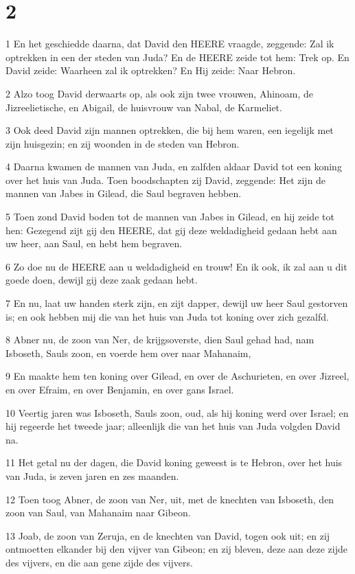 \chapter{2}

\par 1 En het geschiedde daarna, dat David den HEERE vraagde, zeggende: Zal ik optrekken in een der steden van Juda? En de HEERE zeide tot hem: Trek op. En David zeide: Waarheen zal ik optrekken? En Hij zeide: Naar Hebron.
\par 2 Alzo toog David derwaarts op, als ook zijn twee vrouwen, Ahinoam, de Jizreelietische, en Abigail, de huisvrouw van Nabal, de Karmeliet.
\par 3 Ook deed David zijn mannen optrekken, die bij hem waren, een iegelijk met zijn huisgezin; en zij woonden in de steden van Hebron.
\par 4 Daarna kwamen de mannen van Juda, en zalfden aldaar David tot een koning over het huis van Juda. Toen boodschapten zij David, zeggende: Het zijn de mannen van Jabes in Gilead, die Saul begraven hebben.
\par 5 Toen zond David boden tot de mannen van Jabes in Gilead, en hij zeide tot hen: Gezegend zijt gij den HEERE, dat gij deze weldadigheid gedaan hebt aan uw heer, aan Saul, en hebt hem begraven.
\par 6 Zo doe nu de HEERE aan u weldadigheid en trouw! En ik ook, ik zal aan u dit goede doen, dewijl gij deze zaak gedaan hebt.
\par 7 En nu, laat uw handen sterk zijn, en zijt dapper, dewijl uw heer Saul gestorven is; en ook hebben mij die van het huis van Juda tot koning over zich gezalfd.
\par 8 Abner nu, de zoon van Ner, de krijgsoverste, dien Saul gehad had, nam Isboseth, Sauls zoon, en voerde hem over naar Mahanaim,
\par 9 En maakte hem ten koning over Gilead, en over de Aschurieten, en over Jizreel, en over Efraim, en over Benjamin, en over gans Israel.
\par 10 Veertig jaren was Isboseth, Sauls zoon, oud, als hij koning werd over Israel; en hij regeerde het tweede jaar; alleenlijk die van het huis van Juda volgden David na.
\par 11 Het getal nu der dagen, die David koning geweest is te Hebron, over het huis van Juda, is zeven jaren en zes maanden.
\par 12 Toen toog Abner, de zoon van Ner, uit, met de knechten van Isboseth, den zoon van Saul, van Mahanaim naar Gibeon.
\par 13 Joab, de zoon van Zeruja, en de knechten van David, togen ook uit; en zij ontmoetten elkander bij den vijver van Gibeon; en zij bleven, deze aan deze zijde des vijvers, en die aan gene zijde des vijvers.

